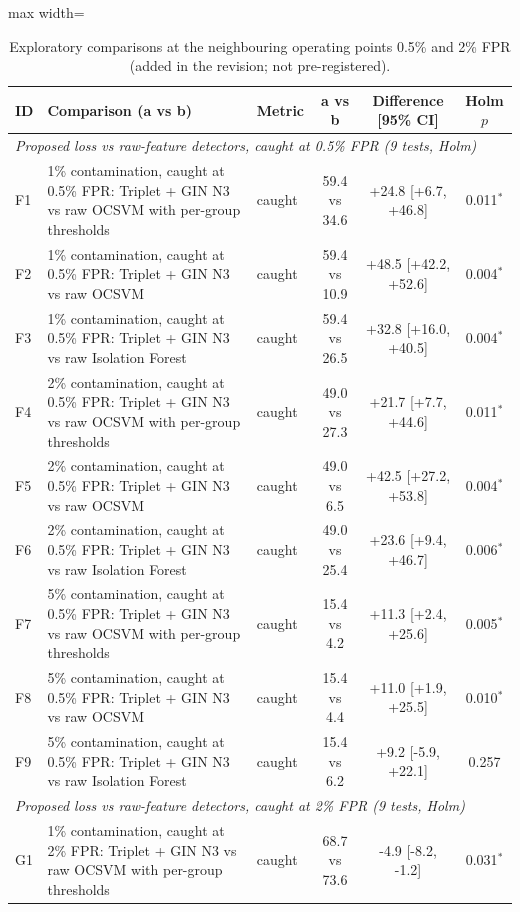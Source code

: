\begin{table}[htbp]
\centering
\scriptsize
\caption{Exploratory comparisons at the neighbouring operating points 0.5\% and 2\% FPR (added in the revision; not pre-registered).}
\label{tab:exploratory-ops}
\begin{adjustbox}{max width=\linewidth}
\begin{tabular}{lp{6.2cm}lccc}
\toprule
ID & Comparison (a vs b) & Metric & a vs b & Difference [95\% CI] & Holm $p$ \\
\midrule
\multicolumn{6}{l}{\textit{Proposed loss vs raw-feature detectors, caught at 0.5\% FPR (9 tests, Holm)}} \\
F1 & 1\% contamination, caught at 0.5\% FPR: Triplet + GIN N3 vs raw OCSVM with per-group thresholds & caught & 59.4 vs 34.6 & +24.8 [+6.7, +46.8] & 0.011$^{*}$ \\
F2 & 1\% contamination, caught at 0.5\% FPR: Triplet + GIN N3 vs raw OCSVM & caught & 59.4 vs 10.9 & +48.5 [+42.2, +52.6] & 0.004$^{*}$ \\
F3 & 1\% contamination, caught at 0.5\% FPR: Triplet + GIN N3 vs raw Isolation Forest & caught & 59.4 vs 26.5 & +32.8 [+16.0, +40.5] & 0.004$^{*}$ \\
F4 & 2\% contamination, caught at 0.5\% FPR: Triplet + GIN N3 vs raw OCSVM with per-group thresholds & caught & 49.0 vs 27.3 & +21.7 [+7.7, +44.6] & 0.011$^{*}$ \\
F5 & 2\% contamination, caught at 0.5\% FPR: Triplet + GIN N3 vs raw OCSVM & caught & 49.0 vs 6.5 & +42.5 [+27.2, +53.8] & 0.004$^{*}$ \\
F6 & 2\% contamination, caught at 0.5\% FPR: Triplet + GIN N3 vs raw Isolation Forest & caught & 49.0 vs 25.4 & +23.6 [+9.4, +46.7] & 0.006$^{*}$ \\
F7 & 5\% contamination, caught at 0.5\% FPR: Triplet + GIN N3 vs raw OCSVM with per-group thresholds & caught & 15.4 vs 4.2 & +11.3 [+2.4, +25.6] & 0.005$^{*}$ \\
F8 & 5\% contamination, caught at 0.5\% FPR: Triplet + GIN N3 vs raw OCSVM & caught & 15.4 vs 4.4 & +11.0 [+1.9, +25.5] & 0.010$^{*}$ \\
F9 & 5\% contamination, caught at 0.5\% FPR: Triplet + GIN N3 vs raw Isolation Forest & caught & 15.4 vs 6.2 & +9.2 [-5.9, +22.1] & 0.257 \\
\multicolumn{6}{l}{\textit{Proposed loss vs raw-feature detectors, caught at 2\% FPR (9 tests, Holm)}} \\
G1 & 1\% contamination, caught at 2\% FPR: Triplet + GIN N3 vs raw OCSVM with per-group thresholds & caught & 68.7 vs 73.6 & -4.9 [-8.2, -1.2] & 0.031$^{*}$ \\

\end{tabular}
\end{adjustbox}
\end{table}

